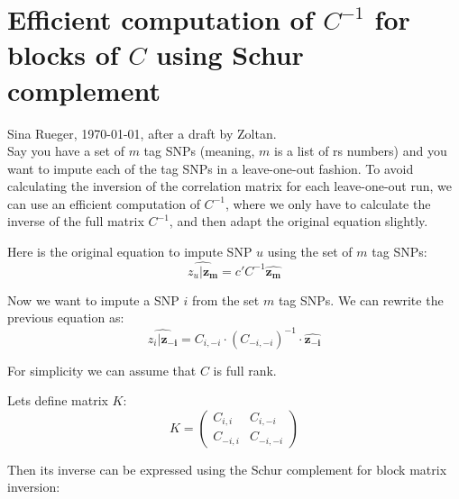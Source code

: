 \documentclass{article}
\newcommand{\tensor}[1]{#1}
\begin{document}
\section*{Efficient computation of $\tensor{C}^{-1}$ for blocks of $\tensor{C}$ using Schur complement}

Sina Rueger, \today, after a draft by Zoltan.\\

Say you have a set of $m$ tag SNPs (meaning, $m$ is a list of rs numbers) and you want to impute each of the tag SNPs in a leave-one-out fashion. To avoid calculating the inversion of the correlation matrix for each leave-one-out run, we can use an efficient computation of $\tensor{C}^{-1}$, where we only have to calculate the inverse of the full matrix $\tensor{C}^{-1}$, and then adapt the original equation slightly.

Here is the original equation to impute SNP $u$ using the set of $m$ tag SNPs:
\begin{equation*}
  \widehat{z_{u}|\bm{z_{m}}} = \tensor{c}'  \tensor{C}^{-1}  \widehat{\bm{z_m}}
\end{equation*}

Now we want to impute a SNP $i$ from the set $m$ tag SNPs. We can rewrite the previous equation as:
\begin{equation*}
 \widehat{z_{i}|\bm{z_{-i}}}  = \tensor{C}_{i,-i} \cdot (\tensor{C}_{-i,-i})^{-1} \cdot  \widehat{\bm{z_{-i}}}
 \end{equation*}

For simplicity we can assume that $\tensor{C}$ is full rank. 



Lets define matrix $\tensor{K}$:
\begin{equation*}
 \tensor{K} = \left( \begin{array}{cc} \tensor{C}_{i,i} & \tensor{C}_{i,-i}\\ \tensor{C}_{-i,i} & \tensor{C}_{-i,-i} \end{array} \right) 
\end{equation*}

Then its inverse can be expressed using the Schur complement for block matrix inversion:
\end{document}
